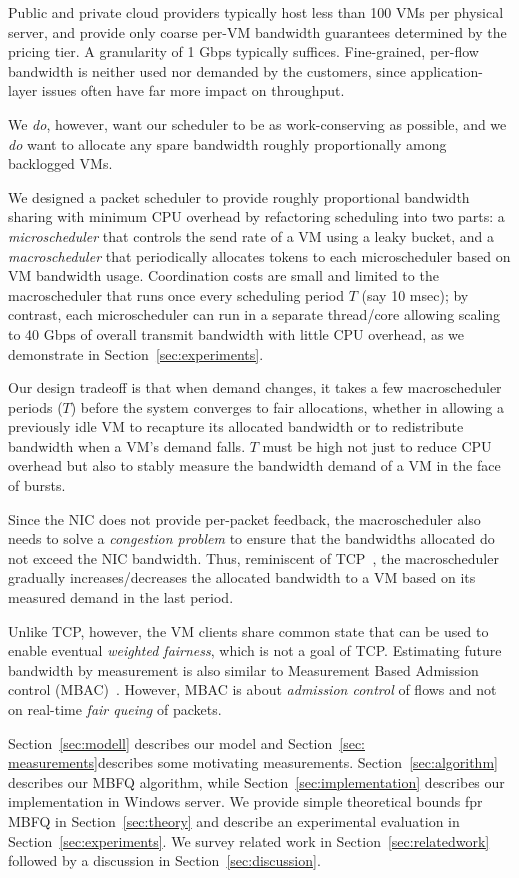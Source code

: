  Public and private cloud providers typically host 
less than 100 VMs per physical server, and provide only coarse per-VM bandwidth guarantees
determined by the pricing tier.  A granularity of 1 Gbps typically suffices.  Fine-grained, per-flow bandwidth is neither
used nor demanded by the customers, since application-layer issues often have
far more impact on throughput.

We {\em do}, however, want our scheduler to be as
work-conserving as possible, and we {\em do} want to allocate any spare
bandwidth roughly proportionally among backlogged VMs.

We designed a packet scheduler to provide roughly proportional bandwidth sharing
with  minimum CPU overhead by refactoring scheduling into two parts: a {\em
microscheduler} that controls the send rate of a VM using a leaky bucket,
and a {\em macroscheduler} that periodically allocates tokens to each
microscheduler based on VM bandwidth usage.  Coordination costs are small and
limited to the macroscheduler that runs once every scheduling period $T$ (say 10
msec); by contrast, each microscheduler can run in a separate thread/core
allowing scaling to 40 Gbps of overall transmit bandwidth with little CPU
overhead, as we demonstrate in Section~\ref{sec:experiments}.

Our design tradeoff is that when demand changes, it takes a few 
macroscheduler periods ($T$) before the system converges to fair allocations,
whether in allowing a previously idle VM to recapture its allocated bandwidth or
to redistribute bandwidth when a VM's demand falls.  $T$  must be high not just
to reduce CPU overhead but also to stably measure the bandwidth demand of a VM
in the face of bursts.

Since the NIC does not provide per-packet feedback, the macroscheduler also
needs to solve a {\em congestion problem} to ensure that the bandwidths
allocated do not exceed the NIC bandwidth.  Thus, reminiscent of TCP~\cite{tcp},
the macroscheduler gradually increases/decreases the allocated bandwidth to a VM
based on its measured demand in the last period.  

Unlike TCP, however, the VM clients share common state that can be used to
enable eventual {\em weighted fairness}, which is not a goal of TCP.  Estimating
future bandwidth by measurement is also similar to  Measurement Based Admission
control (MBAC)~\cite{mbac}.  However, MBAC is about {\em admission control} of
flows  and not on real-time {\em fair queing} of packets. 

Section~\ref{sec:modell} describes our model and Section~\ref{sec: measurements}describes
some motivating measurements.  Section~\ref{sec:algorithm}
describes our MBFQ algorithm, while Section~\ref{sec:implementation} describes
our implementation in Windows server.
We provide simple theoretical bounds fpr MBFQ in
Section~\ref{sec:theory} and describe an experimental evaluation 
in Section~\ref{sec:experiments}.  We survey related work in Section~\ref{sec:relatedwork} followed by a
discussion in Section~\ref{sec:discussion}.
